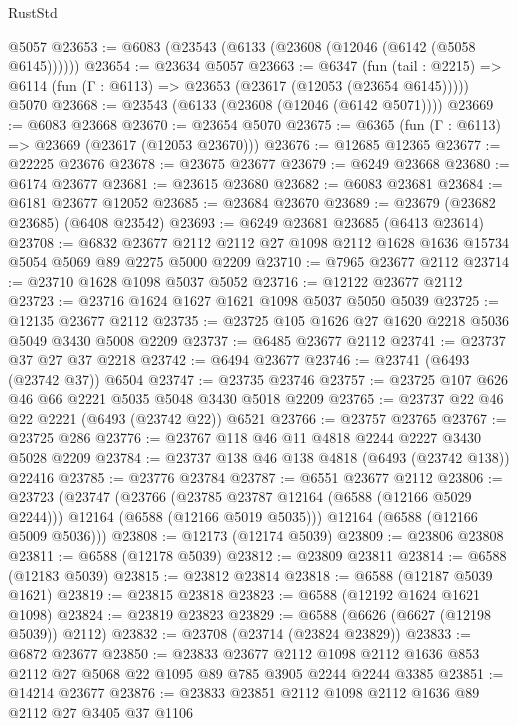 \begin{lexlean}{RustStd}
\begin{coremodule}
    @5057
@23653 := @6083 (@23543 (@6133 (@23608 (@12046 (@6142 (@5058 @6145))))))
@23654 := @23634 @5057
@23663 := @6347
    (fun (tail : @2215) => @6114 (fun (Γ : @6113) => @23653 (@23617 (@12053 (@23654 @6145)))))
    @5070
@23668 := @23543 (@6133 (@23608 (@12046 (@6142 @5071))))
@23669 := @6083 @23668
@23670 := @23654 @5070
@23675 := @6365 (fun (Γ : @6113) => @23669 (@23617 (@12053 @23670)))
@23676 := @12685 @12365
@23677 := @22225 @23676
@23678 := @23675 @23677
@23679 := @6249 @23668
@23680 := @6174 @23677
@23681 := @23615 @23680
@23682 := @6083 @23681
@23684 := @6181 @23677 @12052
@23685 := @23684 @23670
@23689 := @23679 (@23682 @23685) (@6408 @23542)
@23693 := @6249 @23681 @23685 (@6413 @23614)
@23708 := @6832
    @23677
    @2112
    @2112
    @27
    @1098
    @2112
    @1628
    @1636
    @15734
    @5054
    @5069
    @89
    @2275
    @5000
    @2209
@23710 := @7965 @23677 @2112
@23714 := @23710 @1628 @1098 @5037 @5052
@23716 := @12122 @23677 @2112
@23723 := @23716 @1624 @1627 @1621 @1098 @5037 @5050 @5039
@23725 := @12135 @23677 @2112
@23735 := @23725 @105 @1626 @27 @1620 @2218 @5036 @5049 @3430 @5008 @2209
@23737 := @6485 @23677 @2112
@23741 := @23737 @37 @27 @37 @2218
@23742 := @6494 @23677
@23746 := @23741 (@6493 (@23742 @37)) @6504
@23747 := @23735 @23746
@23757 := @23725 @107 @626 @46 @66 @2221 @5035 @5048 @3430 @5018 @2209
@23765 := @23737 @22 @46 @22 @2221 (@6493 (@23742 @22)) @6521
@23766 := @23757 @23765
@23767 := @23725 @286
@23776 := @23767 @118 @46 @11 @4818 @2244 @2227 @3430 @5028 @2209
@23784 := @23737 @138 @46 @138 @4818 (@6493 (@23742 @138)) @22416
@23785 := @23776 @23784
@23787 := @6551 @23677 @2112
@23806 := @23723
    (@23747
      (@23766
        (@23785 @23787 @12164 (@6588 (@12166 @5029 @2244)))
        @12164
        (@6588 (@12166 @5019 @5035)))
      @12164
      (@6588 (@12166 @5009 @5036)))
@23808 := @12173 (@12174 @5039)
@23809 := @23806 @23808
@23811 := @6588 (@12178 @5039)
@23812 := @23809 @23811
@23814 := @6588 (@12183 @5039)
@23815 := @23812 @23814
@23818 := @6588 (@12187 @5039 @1621)
@23819 := @23815 @23818
@23823 := @6588 (@12192 @1624 @1621 @1098)
@23824 := @23819 @23823
@23829 := @6588 (@6626 (@6627 (@12198 @5039)) @2112)
@23832 := @23708 (@23714 (@23824 @23829))
@23833 := @6872 @23677
@23850 := @23833
    @23677
    @2112
    @1098
    @2112
    @1636
    @853
    @2112
    @27
    @5068
    @22
    @1095
    @89
    @785
    @3905
    @2244
    @2244
    @3385
@23851 := @14214 @23677
@23876 := @23833
    @23851
    @2112
    @1098
    @2112
    @1636
    @89
    @2112
    @27
    @3405
    @37
    @1106

\end{coremodule}
\end{lexlean}
